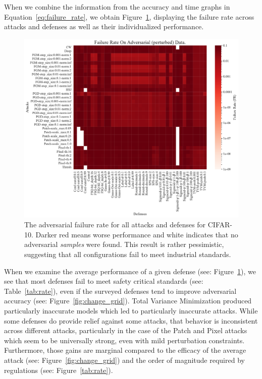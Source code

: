 \documentclass[journal]{IEEEtran}
\newcommand{\cm}[1]{\textit{{\color{blue}#1}}}
\begin{document}
When we combine the information from the accuracy and time graphs in Equation~\ref{eq:failure_rate}, we obtain Figure~\ref{fig:rate_grid}, displaying the failure rate across attacks and defenses as well as their individualized performance.  
\begin{figure}[!hptb]
    {\centering
    \includegraphics[trim={0 0.85em 0 0.35em},clip,height=0.6\textwidth]{Fig15.pdf}
    \vspace{-0.75em}
    \caption{The adversarial failure rate for all attacks and defenses for CIFAR-10. Darker red means worse performance and white indicates that no adversarial \cm{samples} were found. This result is rather pessimistic, suggesting that all configurations fail to meet industrial standards.}
    \label{fig:rate_grid}
    } %
\end{figure}
When we examine the average performance of a given defense (see: Figure~\ref{fig:rate_grid}), we see that most defenses fail to meet safety critical standards (see: Table~\ref{tab:rate}), even if the surveyed defenses tend to improve adversarial accuracy (see: Figure~\ref{fig:change_grid}). Total Variance Minimization produced particularly inaccurate models which led to particularly inaccurate attacks.  While some defenses do provide relief against some attacks, that behavior is inconsistent across different attacks, particularly in the case of the Patch and Pixel attacks which seem to be universally strong, even with mild perturbation constraints. Furthermore, those gains are marginal compared to the efficacy of the average attack (see: Figure~\ref{fig:change_grid}) and the order of magnitude required by regulations (see: Figure~\ref{tab:rate}).
\end{document}
